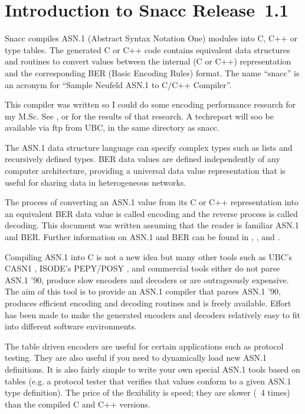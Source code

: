 
%

\chapter{\label{intro-1.1}Introduction to Snacc Release~1.1}

Snacc compiles ASN.1 \cite{X.208} (Abstract Syntax Notation One)
modules into C, C++ or type tables.  The generated C or C++ code
contains equivalent data structures and routines to convert values
between the internal (C or C++) representation and the corresponding
BER \cite{X.209} (Basic Encoding Rules) format.  The name ``snacc'' is
an acronym for ``Sample Neufeld ASN.1 to C/C++ Compiler''.

This compiler was written so I could do some encoding performance
research for my M.Sc.  See \cite{Sample93-1}, or \cite{Sample93-2} for
the results of that research.  A techreport will soo be available
via ftp from UBC, in the same directory as snacc.

The ASN.1 data structure language can specify complex types such as
lists and recursively defined types. BER data values are defined
independently of any computer architecture, providing a universal data
value representation that is useful for sharing data in heterogeneous
networks.

The process of converting an ASN.1 value from its C or C++
representation into an equivalent BER data value is called encoding
and the reverse process is called decoding.  This document was written
assuming that the reader is familiar ASN.1 and BER.  Further
information on ASN.1 and BER can be found in \cite{ASN.1Book},
\cite{ASN.1Overview}, \cite{X.208} and \cite{X.209}.

Compiling ASN.1 into C is not a new idea but many other tools such as
UBC's CASN1 \cite{CASN1}, ISODE's PEPY/POSY \cite{ISODE}, and
commercial tools either do not parse ASN.1 '90, produce slow encoders
and decoders or are outrageously expensive. The aim of this tool is to
provide an ASN.1 compiler that parses ASN.1 '90, produces efficient
encoding and decoding routines and is freely available.  Effort has
been made to make the generated encoders and decoders relatively easy
to fit into different software environments.

The table driven encoders are useful for certain applications such as
protocol testing.  They are also useful if you need to dynamically
load new ASN.1 definitions.  It is also fairly simple to write your
own special ASN.1 tools based on tables (e.g. a protocol tester that
verifies that values conform to a given ASN.1 type definition).  The
price of the flexibility is speed; they are slower (~4 times) than the
compiled C and C++ versions.

